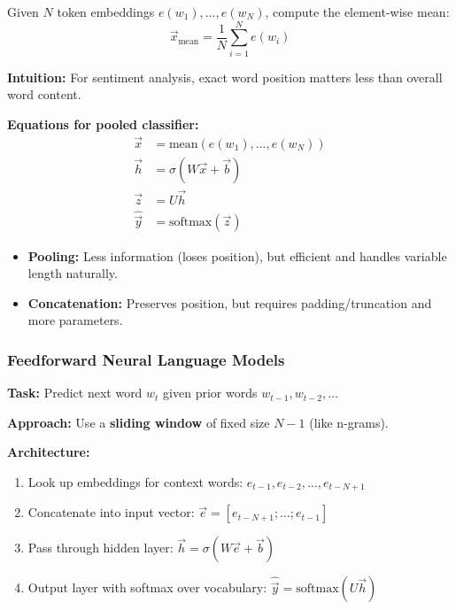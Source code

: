 \begin{defbox}
Given $N$ token embeddings $e(w_1), \ldots, e(w_N)$, compute the element-wise mean:
\[
\vec{x}_{\text{mean}} = \frac{1}{N} \sum_{i=1}^{N} e(w_i)
\]

\textbf{Intuition:} For sentiment analysis, exact word position matters less than overall word content.

\textbf{Equations for pooled classifier:}
\begin{align*}
\vec{x} &= \text{mean}(e(w_1), \ldots, e(w_N)) \\
\vec{h} &= \sigma(W\vec{x} + \vec{b}) \\
\vec{z} &= U\vec{h} \\
\hat{\vec{y}} &= \text{softmax}(\vec{z})
\end{align*}
\end{defbox}

\begin{tipbox}
\begin{itemize}
  \item \textbf{Pooling:} Less information (loses position), but efficient and handles variable length naturally.
  \item \textbf{Concatenation:} Preserves position, but requires padding/truncation and more parameters.
\end{itemize}
\end{tipbox}

\bigseparator

\subsubsection{Feedforward Neural Language Models}

\begin{defbox}
\textbf{Task:} Predict next word $w_t$ given prior words $w_{t-1}, w_{t-2}, \ldots$

\textbf{Approach:} Use a \textbf{sliding window} of fixed size $N-1$ (like n-grams).

\textbf{Architecture:}
\begin{enumerate}
  \item Look up embeddings for context words: $e_{t-1}, e_{t-2}, \ldots, e_{t-N+1}$
  \item Concatenate into input vector: $\vec{e} = [e_{t-N+1}; \ldots; e_{t-1}]$
  \item Pass through hidden layer: $\vec{h} = \sigma(W\vec{e} + \vec{b})$
  \item Output layer with softmax over vocabulary: $\hat{\vec{y}} = \text{softmax}(U\vec{h})$
\end{enumerate}
\end{defbox}

